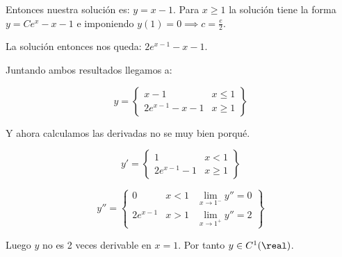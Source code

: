 \documentclass[nochap]{apuntes}
\begin{document}
\begin{problem}[12]
Entonces nuestra solución es: $y=x-1$. Para $x\ge 1$ la solución tiene la forma $y = Ce^x-x-1$ e imponiendo $y(1)=0 \implies c=\frac{e}{2}$.

La solución entonces nos queda: $2e^{x-1}-x-1$. 


Juntando ambos resultados llegamos a:

\[y=\left\{\begin{array}{cc}
x-1 & x\leq 1\\
2e^{x-1}-x-1 & x \ge1
\end{array}\right\}\]

Y ahora calculamos las derivadas no se muy bien porqué.

\[y' = \left\{\begin{array}{cc}
1 & x<1\\
2e^{x-1} - 1 & x\ge 1
\end{array}\right\}\]

\[y'' = \left\{\begin{array}{ccc}
0 & x<1 & \lim_{x\to 1^{-}} y''=0\\
2e^{x-1} & x>1 & \lim_{x\to1^{+}} y''=2
\end{array}\right\}\]

Luego $y$ no es 2 veces derivable en $x=1$. Por tanto $y\in C^1(\real)$.
\end{problem}
\end{document}
